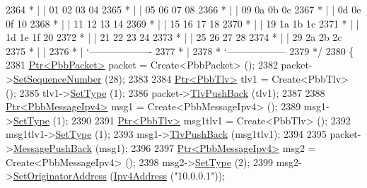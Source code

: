 \begin{DoxyCode}
2364 \textcolor{comment}{         * |    |                           01  02  03  04}
2365 \textcolor{comment}{         * |    |                           05  06  07  08}
2366 \textcolor{comment}{         * |    |                           09  0a  0b  0c}
2367 \textcolor{comment}{         * |    |                           0d  0e  0f  10}
2368 \textcolor{comment}{         * |    |                           11  12  13  14}
2369 \textcolor{comment}{         * |    |                           15  16  17  18}
2370 \textcolor{comment}{         * |    |                           19  1a  1b  1c}
2371 \textcolor{comment}{         * |    |                           1d  1e  1f  20}
2372 \textcolor{comment}{         * |    |                           21  22  23  24}
2373 \textcolor{comment}{         * |    |                           25  26  27  28}
2374 \textcolor{comment}{         * |    |                           29  2a  2b  2c}
2375 \textcolor{comment}{         * |    |}
2376 \textcolor{comment}{         * |    `-------------------}
2377 \textcolor{comment}{         * |}
2378 \textcolor{comment}{         * `------------------}
2379 \textcolor{comment}{   */}
2380   \{
2381     \hyperlink{classns3_1_1Ptr}{Ptr<PbbPacket>} packet = Create<PbbPacket> ();
2382     packet->\hyperlink{classns3_1_1PbbPacket_a7d6a1602be86109760d0f26ff9bbbb8e}{SetSequenceNumber} (28);
2383 
2384     \hyperlink{classns3_1_1Ptr}{Ptr<PbbTlv>} tlv1 = Create<PbbTlv> ();
2385     tlv1->\hyperlink{classns3_1_1PbbTlv_a90a0452018ed364ac37c3ad116dd718b}{SetType} (1);
2386     packet->\hyperlink{classns3_1_1PbbPacket_a34935793e729a106c176db99c969cb42}{TlvPushBack} (tlv1);
2387 
2388     \hyperlink{classns3_1_1Ptr}{Ptr<PbbMessageIpv4>} msg1 = Create<PbbMessageIpv4> ();
2389     msg1->\hyperlink{classns3_1_1PbbMessage_a4b3d1eaabd3e7412a46ac79bf3360dac}{SetType} (1);
2390 
2391     \hyperlink{classns3_1_1Ptr}{Ptr<PbbTlv>} msg1tlv1 = Create<PbbTlv> ();
2392     msg1tlv1->\hyperlink{classns3_1_1PbbTlv_a90a0452018ed364ac37c3ad116dd718b}{SetType} (1);
2393     msg1->\hyperlink{classns3_1_1PbbMessage_aac70b2672f79765cf5cc5b6666018165}{TlvPushBack} (msg1tlv1);
2394 
2395     packet->\hyperlink{classns3_1_1PbbPacket_a4a3170001ef758d9c9c4375b8f089826}{MessagePushBack} (msg1);
2396 
2397     \hyperlink{classns3_1_1Ptr}{Ptr<PbbMessageIpv4>} msg2 = Create<PbbMessageIpv4> ();
2398     msg2->\hyperlink{classns3_1_1PbbMessage_a4b3d1eaabd3e7412a46ac79bf3360dac}{SetType} (2);
2399     msg2->\hyperlink{classns3_1_1PbbMessage_a52ac135a2bec53db5e8f46b8b8a25e7c}{SetOriginatorAddress} (\hyperlink{classns3_1_1Ipv4Address}{Ipv4Address} (\textcolor{stringliteral}{"10.0.0.1"}));

\end{DoxyCode}
